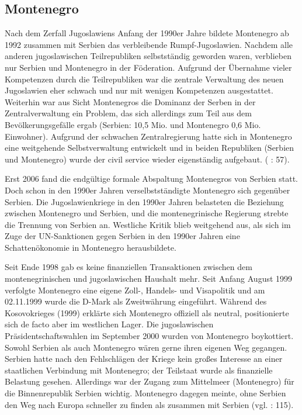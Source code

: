 \subsection{Montenegro}
Nach dem Zerfall Jugoslawiens Anfang der 1990er Jahre bildete Montenegro ab 1992 zusammen mit Serbien das verbleibende Rumpf-Jugoslawien. Nachdem alle anderen jugoslawischen Teilrepubliken selbstständig geworden waren, verblieben nur Serbien und Montenegro in der Föderation. Aufgrund der Übernahme vieler Kompetenzen durch die Teilrepubliken war die zentrale Verwaltung des neuen Jugoslawien eher schwach und nur mit wenigen Kompetenzen ausgestattet. Weiterhin war aus Sicht Montenegros die Dominanz der Serben in der Zentralverwaltung ein Problem, das sich allerdings zum Teil aus dem Bevölkerungsgefälle ergab (Serbien: 10,5 Mio. und Montenegro 0,6 Mio. Einwohner). Aufgrund der schwachen Zentralregierung hatte sich in Montenegro eine weitgehende Selbstverwaltung entwickelt und in beiden Republiken (Serbien und Montenegro) wurde der civil service wieder eigenständig aufgebaut. (\cite{sevic} : 57).\par
Erst 2006 fand die endgültige formale Abspaltung Montenegros von Serbien statt. Doch schon in den 1990er Jahren verselbstständigte Montenegro sich gegenüber Serbien. Die Jugoslawienkriege in den 1990er Jahren belasteten die Beziehung zwischen Montenegro und Serbien, und die montenegrinische Regierung strebte die Trennung von Serbien an. Westliche Kritik blieb weitgehend aus, als sich im Zuge der UN-Sanktionen gegen Serbien in den 1990er Jahren eine Schattenökonomie in Montenegro herausbildete.\par
Seit Ende 1998 gab es keine finanziellen Transaktionen zwischen dem montenegrinischen und jugoslawischen Haushalt mehr. Seit Anfang August 1999 verfolgte Montenegro eine eigene Zoll-, Handels- und Visapolitik und am 02.11.1999 wurde die D-Mark als Zweitwährung eingeführt. Während des Kosovokrieges (1999) erklärte sich Montenegro offiziell als neutral, positionierte sich de facto aber im westlichen Lager. Die jugoslawischen Präsidentschaftswahlen im September 2000 wurden von Montenegro boykottiert. Sowohl Serbien als auch Montenegro wären gerne ihren eigenen Weg gegangen. Serbien hatte nach den Fehlschlägen der Kriege kein großes Interesse an einer staatlichen Verbindung mit Montenegro; der Teilstaat wurde als finanzielle Belastung gesehen. Allerdings war der Zugang zum Mittelmeer (Montenegro) für die Binnenrepublik Serbien wichtig. Montenegro dagegen meinte, ohne Serbien den Weg nach Europa schneller zu finden als zusammen mit Serbien (vgl. \cite{schmitz04} : 115).\par
